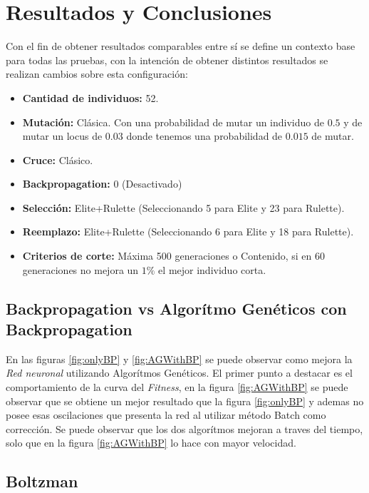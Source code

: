 \documentclass{sig-alternate}
\begin{document}
	\section{Resultados y Conclusiones}

		Con el fin de obtener resultados comparables entre sí se define un
		contexto base para todas las pruebas, con la intención de obtener distintos 
		resultados se realizan cambios sobre esta configuración:

		\begin{itemize}
			\item \textbf{Cantidad de individuos:} 52.
			\item \textbf{Mutación:} Clásica. Con una probabilidad de mutar un individuo de $0.5$ 
			y de mutar un locus de $0.03$ donde tenemos una probabilidad de $0.015$ de mutar.
			\item \textbf{Cruce:} Clásico.
			\item \textbf{Backpropagation:} 0 (Desactivado)
			\item \textbf{Selección:} Elite+Rulette (Seleccionando 5 para Elite y 23 para Rulette).
			\item \textbf{Reemplazo:} Elite+Rulette (Seleccionando 6 para Elite y 18 para Rulette).
			\item \textbf{Criterios de corte:} Máxima 500 generaciones o Contenido, si en 60 generaciones
			no mejora un $1\%$ el mejor individuo corta.
		\end{itemize}

		\subsection{Backpropagation vs Algorítmo Genéticos con Backpropagation}


		En las figuras \ref{fig:onlyBP} y \ref{fig:AGWithBP} se puede observar como mejora la \textit{Red neuronal} utilizando Algorítmos Genéticos. El primer punto a destacar es el comportamiento de la curva del \textit{Fitness}, en la figura \ref{fig:AGWithBP} se puede observar que se obtiene un mejor resultado que la figura \ref{fig:onlyBP} y ademas no posee esas oscilaciones que presenta la red al utilizar método Batch como corrección. Se puede observar que los dos algorítmos mejoran a traves del tiempo, solo que en la figura \ref{fig:AGWithBP} lo hace con mayor velocidad.
		
		\subsection{Boltzman}
\end{document}
